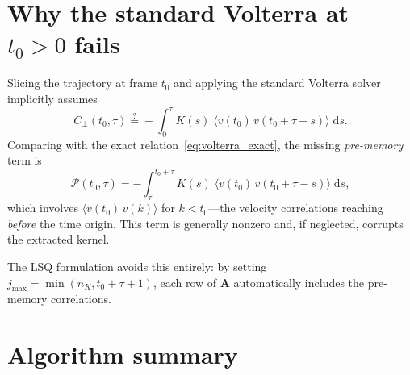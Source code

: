 \documentclass[11pt]{article}
\newcommand{\avg}[1]{\langle #1 \rangle}
\newcommand{\dd}{\mathrm{d}}
\begin{document}
\section{Why the standard Volterra at $t_0 > 0$ fails}

Slicing the trajectory at frame $t_0$ and applying the standard Volterra
solver implicitly assumes
\begin{equation}\label{eq:wrong}
  C_{\perp}(t_0,\tau)
  \stackrel{?}{=} -\int_0^{\tau} K(s)\;\avg{v(t_0)\,v(t_0+\tau-s)}\;\dd s.
\end{equation}
Comparing with the exact relation~\eqref{eq:volterra_exact}, the missing
\emph{pre-memory} term is
\begin{equation}
  \mathcal{P}(t_0,\tau)
  = -\int_{\tau}^{t_0+\tau} K(s)\;\avg{v(t_0)\,v(t_0+\tau-s)}\;\dd s,
\end{equation}
which involves $\avg{v(t_0)\,v(k)}$ for $k < t_0$---the velocity
correlations reaching \emph{before} the time origin.  This term is generally
nonzero and, if neglected, corrupts the extracted kernel.

The LSQ formulation avoids this entirely: by setting
$j_{\max} = \min(n_K, t_0+\tau+1)$, each row of $\bm{A}$ automatically
includes the pre-memory correlations.

\section{Algorithm summary}
\end{document}
